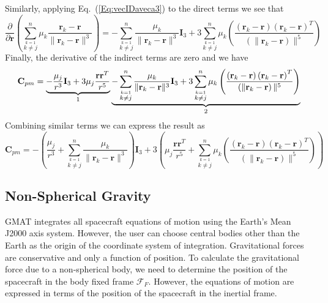 Similarly, applying Eq.~(\ref{Eq:vecIDaveca3}) to the direct terms
we see that
%
\begin{equation}
     \frac{\partial }{\partial \mathbf{r}} \left( \sum_{\stackrel{k=1}{k \neq j}}^{n} \mu_k \frac{\mathbf{r}_{k} -
     \mathbf{r}}{\| \mathbf{r}_{k} - \mathbf{r}\|^3}\right) =  -\sum_{\stackrel{k=1}{k \neq j}}^{n}
     \frac{\mu_k}{\| \mathbf{r}_{k} - \mathbf{r}\|^3}\mathbf{I}_3 + 3\sum_{\stackrel{k=1}{k \neq
     j}}^{n}\mu_k \left( \frac{\left( \mathbf{r}_{k} - \mathbf{r} \right)\left( \mathbf{r}_{k} -
     \mathbf{r} \right)^T}{\left( \|\mathbf{r}_{k} - \mathbf{r} \right)\|^5}  \right)
\end{equation}
%
Finally, the derivative of the indirect terms are zero and we have
%
\begin{equation}
   \mathbf{C}_{pm} =  \underbrace{-\frac{\mu_j}{r^3} \mathbf{I}_3
     + 3\mu_j\frac{\mathbf{r}\mathbf{r}^T}{r^5}}_{ 1 }
     \underbrace{
     -  \sum_{\stackrel{k=1}{k \neq j}}^{n}
     \frac{\mu_k}{\| \mathbf{r}_{k} - \mathbf{r}\|^3}\mathbf{I}_3 + 3\sum_{\stackrel{k=1}{k \neq
     j}}^{n} \mu_k \left( \frac{\left( \mathbf{r}_{k} - \mathbf{r} \right)\left( \mathbf{r}_{k} -
     \mathbf{r} \right)^T}{\left( \|\mathbf{r}_{k} - \mathbf{r} \right)\|^5}  \right)
       }_{2}
\end{equation}
%
Combining similar terms we can express the result as
%
\begin{equation}
   \mathbf{C}_{pm} =  -  \left( \frac{\mu_j}{r^3} + \sum_{\stackrel{k=1}{k \neq j}}^{n}
     \frac{\mu_k}{\| \mathbf{r}_{k} - \mathbf{r}\|^3} \right)\mathbf{I}_3
     + 3 \left( \mu_j\frac{\mathbf{r}\mathbf{r}^T}{r^5}
       + \sum_{\stackrel{k=1}{k \neq
     j}}^{n} \mu_k \left( \frac{\left( \mathbf{r}_{k} - \mathbf{r} \right)\left( \mathbf{r}_{k} -
     \mathbf{r} \right)^T}{\left( \|\mathbf{r}_{k} - \mathbf{r} \right)\|^5}
     \right) \right)
\end{equation}

\subsection{Non-Spherical Gravity }

GMAT integrates all spacecraft equations of motion using the
Earth's Mean J2000 axis system. However, the user can choose
central bodies other than the Earth as the origin of the
coordinate system of integration.  Gravitational forces are
conservative and only a function of position.  To calculate the
gravitational force due to a non-spherical body, we need to
determine the position of the spacecraft in the body fixed frame
$\mathcal{F}_F$.  However, the equations of motion are expressed
in terms of the position of the spacecraft in the inertial frame.

